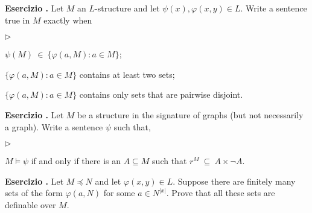 \documentclass[10pt]{article}
\def\phi{\varphi}
\newcommand{\labella}[1]{{\sf\footnotesize #1}\hfill}
\renewenvironment{itemize}
  {\begin{list}{$\triangleright$}{%
   \setlength{\parskip}{0mm}
   \setlength{\topsep}{0mm}
   \setlength{\rightmargin}{0mm}
   \setlength{\listparindent}{0mm}
   \setlength{\itemindent}{0mm}
   \setlength{\labelwidth}{3ex}
   \setlength{\itemsep}{0mm}
   \setlength{\parsep}{0mm}
   \setlength{\partopsep}{0mm}
   \setlength{\labelsep}{1ex}
   \setlength{\leftmargin}{\labelwidth+\labelsep}
   \let\makelabel\labella}}{%
   \end{list}}
\newcounter{ex}
\newenvironment{exercise}{\clearpage\addtocounter{ex}{1}\textbf{Esercizio \theex.\quad}}{}
\begin{document}
\clearpage%
\rhead{}\setcounter{ex}{0}



\begin{exercise}
Let $M$ an $L$-structure and let $\psi(x), \phi(x,y)\in L$. Write a sentence true in $M$ exactly when
\begin{itemize}
\item[a.] $\psi(M)\ \in\ \{\phi(a,M): a\in M\}$;
\item[b.] $\{\phi(a,M): a\in M\}$ contains at least two sets;
\item[c.] $\{\phi(a,M): a\in M\}$ contains only sets that are pairwise disjoint.
\end{itemize}
\end{exercise}

\begin{exercise}
Let $M$ be a structure in the signature of graphs (but not necessarily a graph). Write a sentence $\psi$ such that, 
\begin{itemize} 
\item[a.] $M\models\psi$ if and only if there is an $A\subseteq M$ such that $r^M\ \subseteq\ A\times\neg A$.
\end{itemize}
\end{exercise}

\begin{exercise}
Let $M\preceq N$ and let $\phi(x,y)\in L$. Suppose there are finitely many sets of the form $\phi(a,N)$ for some $a\in N^{|x|}$. Prove that all these sets are definable over $M$.
\end{exercise}
\end{document}
